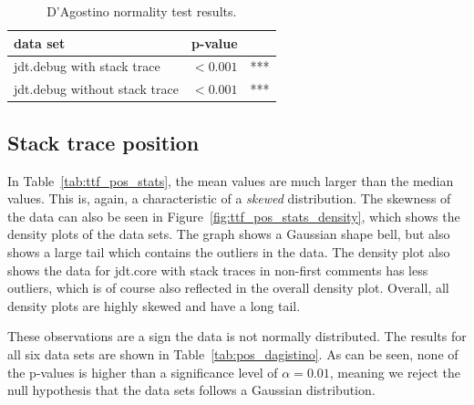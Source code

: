 \begin{table}[!ht]\footnotesize
	\centering
	\begin{tabular}{lrl}
		\toprule
		data set & p-value & \\
		\midrule
		jdt.debug with stack trace & $< 0.001$ & *** \\
		jdt.debug without stack trace & $< 0.001$ & *** \\
		\bottomrule
	\end{tabular} 
	\caption{D'Agostino normality test results.}
	\label{tab:dagistino}
\end{table}

\subsection{Stack trace position} %
\label{sub:norm:stack_trace_position}
In Table~\ref{tab:ttf_pos_stats}, the mean values are much larger than the median values. This is, again, a characteristic of a \emph{skewed} distribution. The skewness of the data can also be seen in Figure~\ref{fig:ttf_pos_stats_density}, which shows the density plots of the data sets. The graph shows a Gaussian shape bell, but also shows a large tail which contains the outliers in the data. The density plot also shows the data for jdt.core with stack traces in non-first comments has less outliers, which is of course also reflected in the overall density plot. Overall, all density plots are highly skewed and have a long tail.

These observations are a sign the data is not normally distributed. The results for all six data sets are shown in Table~\ref{tab:pos_dagistino}. As can be seen, none of the p-values is higher than a significance level of $\alpha = 0.01$, meaning we reject the null hypothesis that the data sets follows a Gaussian distribution. 

